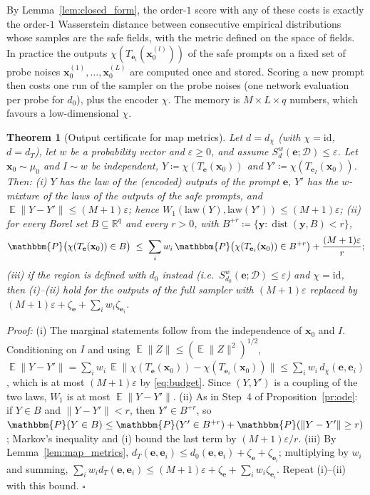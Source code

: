 \documentclass{article}
\DeclareMathOperator{\E}{\mathbb{E}}
\DeclareMathOperator{\dist}{dist}
\newcommand{\RR}{\mathbb{R}}
\newcommand{\cD}{\mathcal{D}}                       %
\newcommand{\bx}{\mathbf{x}}
\newcommand{\by}{\mathbf{y}}
\newcommand{\be}{\mathbf{e}}                       %
\theoremstyle{plain}
\newtheorem{theorem}{Theorem}
\begin{document}
By Lemma~\ref{lem:closed_form}, the order-$1$ score with any of these costs is exactly the order-$1$
Wasserstein distance between consecutive empirical distributions whose samples are the safe
fields, with the metric defined on the space of fields. In practice the outputs
$\chi(T_{\be_i}(\bx_0^{(l)}))$ of the safe prompts on a fixed set of probe noises
$\bx_0^{(1)},\dots,\bx_0^{(L)}$ are computed once and stored. Scoring a new prompt then costs one run of
the sampler on the probe noises (one network evaluation per probe for $d_0$), plus the encoder
$\chi$. The memory is $M\times L\times q$ numbers, which favours a low-dimensional $\chi$.

\begin{theorem}[Output certificate for map metrics]\label{th:map_cert}
Let $d=d_\chi$ (with $\chi=\mathrm{id}$, $d=d_T$), let $w$ be a probability vector and
$\varepsilon\geq0$, and assume $S^w_d(\be;\cD)\leq\varepsilon$. Let $\bx_0\sim\mu_0$ and $I\sim w$ be independent,
$Y\coloneqq\chi(T_{\be}(\bx_0))$ and $Y'\coloneqq\chi(T_{\be_I}(\bx_0))$. Then:
(i) $Y$ has the law of the (encoded) outputs of the prompt $\be$, $Y'$ has the $w$-mixture of the laws
of the outputs of the safe prompts, and $\E\|Y-Y'\|\leq(M+1)\varepsilon$; hence
$W_1(\mathrm{law}(Y),\mathrm{law}(Y'))\leq(M+1)\varepsilon$;
(ii) for every Borel set $B\subseteq\RR^q$ and every $r>0$, with $B^{+r}\coloneqq\{\by:\dist(\by,B)<r\}$,
\[
  \mathbbm{P}\big(\chi(T_{\be}(\bx_0))\in B\big)\;\leq\;\sum_iw_i\,\mathbbm{P}\big(\chi(T_{\be_i}(\bx_0))\in B^{+r}\big)+\frac{(M+1)\varepsilon}{r};
\]
(iii) if the region is defined with $d_0$ instead (i.e.\ $S^w_{d_0}(\be;\cD)\leq\varepsilon$) and
$\chi=\mathrm{id}$, then (i)--(ii) hold for the outputs of the full sampler with $(M+1)\varepsilon$ replaced
by $(M+1)\varepsilon+\zeta_{\be}+\sum_iw_i\zeta_{\be_i}$.
\end{theorem}
\textit{Proof:}
(i) The marginal statements follow from the independence of $\bx_0$ and $I$. Conditioning on $I$ and
using $\E\|Z\|\leq(\E\|Z\|^2)^{1/2}$,
$\E\|Y-Y'\|=\sum_iw_i\,\E\|\chi(T_{\be}(\bx_0))-\chi(T_{\be_i}(\bx_0))\|\leq\sum_iw_i\,d_\chi(\be,\be_i)$, which
is at most $(M+1)\varepsilon$ by \eqref{eq:budget}. Since $(Y,Y')$ is a coupling of the two laws, $W_1$ is
at most $\E\|Y-Y'\|$.
(ii) As in Step~4 of Proposition~\ref{pr:ode}: if $Y\in B$ and $\|Y-Y'\|<r$, then $Y'\in B^{+r}$, so
$\mathbbm{P}(Y\in B)\leq\mathbbm{P}(Y'\in B^{+r})+\mathbbm{P}(\|Y-Y'\|\geq r)$; Markov's inequality and
(i) bound the last term by $(M+1)\varepsilon/r$.
(iii) By Lemma~\ref{lem:map_metrics}, $d_T(\be,\be_i)\leq d_0(\be,\be_i)+\zeta_{\be}+\zeta_{\be_i}$; multiplying by
$w_i$ and summing, $\sum_iw_id_T(\be,\be_i)\leq(M+1)\varepsilon+\zeta_{\be}+\sum_iw_i\zeta_{\be_i}$. Repeat (i)--(ii)
with this bound. \hfill $\square$
\end{document}
